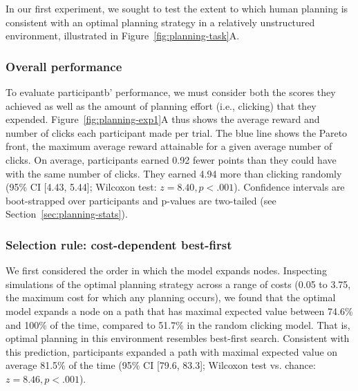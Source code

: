 In our first experiment, we sought to test the extent to which human planning is consistent with an optimal planning strategy in a relatively unstructured environment, illustrated in Figure~\ref{fig:planning-task}A.

\subsubsection{Overall performance}\label{sec:planning-overall}

To evaluate participantb' performance, we must consider both the scores they achieved as well as the amount of planning effort (i.e., clicking) that they expended. Figure~\ref{fig:planning-exp1}A thus shows the average reward and number of clicks each participant made per trial. The blue line shows the Pareto front, the maximum average reward attainable for a given average number of clicks. On average, participants earned 0.92 fewer points than they could have with the same number of clicks. They earned 4.94 more than clicking randomly (95\% CI [4.43, 5.44]; Wilcoxon test: $z = 8.40, p < .001$). Confidence intervals are boot-strapped over participants and p-values are two-tailed (see Section~\ref{sec:planning-stats}).

\subsubsection{Selection rule: cost-dependent best-first}\label{sec:planning-selection}
We first considered the order in which the model expands nodes. Inspecting simulations of the optimal planning strategy across a range of costs (0.05 to 3.75, the maximum cost for which any planning occurs), we found that the optimal model expands a node on a path that has maximal expected value between 74.6\% and 100\% of the time, compared to 51.7\% in the random clicking model.
That is, optimal planning in this environment resembles best-first search. Consistent with this prediction, participants expanded a path with maximal expected value on average 81.5\% of the time (95\% CI [79.6, 83.3]; Wilcoxon test vs. chance: $z = 8.46, p < .001$).

